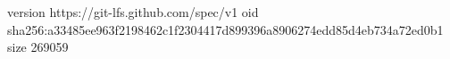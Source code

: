 version https://git-lfs.github.com/spec/v1
oid sha256:a33485ee963f2198462c1f2304417d899396a8906274edd85d4eb734a72ed0b1
size 269059
